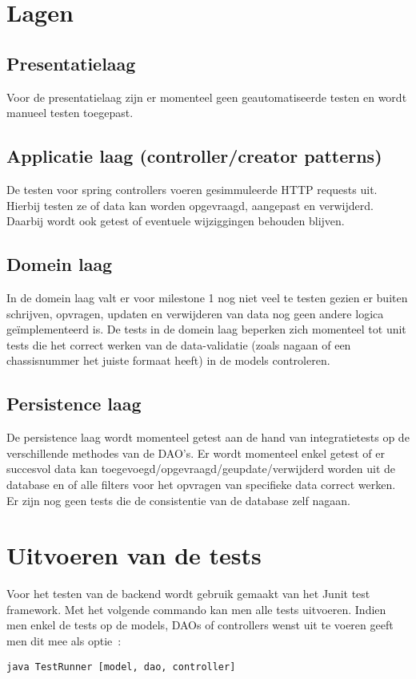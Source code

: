 \documentclass{article}
\begin{document}


\section{Lagen}
\subsection{Presentatielaag}
Voor de presentatielaag zijn er momenteel geen geautomatiseerde testen en wordt manueel testen toegepast.

\subsection{Applicatie laag (controller/creator patterns)}
De testen voor spring controllers voeren gesimmuleerde HTTP requests uit. Hierbij testen ze of data kan worden opgevraagd, aangepast en verwijderd. Daarbij wordt ook getest of eventuele wijziggingen behouden blijven.

\subsection{Domein laag}
In de domein laag valt er voor milestone 1 nog niet veel te testen gezien er buiten schrijven, opvragen, updaten en verwijderen van data nog geen andere logica ge{\"i}mplementeerd is. De tests in de domein laag beperken zich momenteel tot unit tests die het correct werken van de data-validatie (zoals nagaan of een chassisnummer het juiste formaat heeft) in de models controleren.

\subsection{Persistence laag}
De persistence laag wordt momenteel getest aan de hand van integratietests op de verschillende methodes van de DAO's. Er wordt momenteel enkel getest of er succesvol data kan toegevoegd/opgevraagd/geupdate/verwijderd worden uit de database en of alle filters voor het opvragen van specifieke data correct werken. Er zijn nog geen tests die de consistentie van de database zelf nagaan.

\section{Uitvoeren van de tests}
Voor het testen van de backend wordt gebruik gemaakt van het Junit test framework. Met het volgende commando kan men alle tests uitvoeren. Indien men enkel de tests op de models, DAOs of controllers wenst uit te voeren geeft men dit mee als optie~:\\
\begin{center}
	\texttt{java TestRunner [model, dao, controller]}
\end{center}
\end{document}
